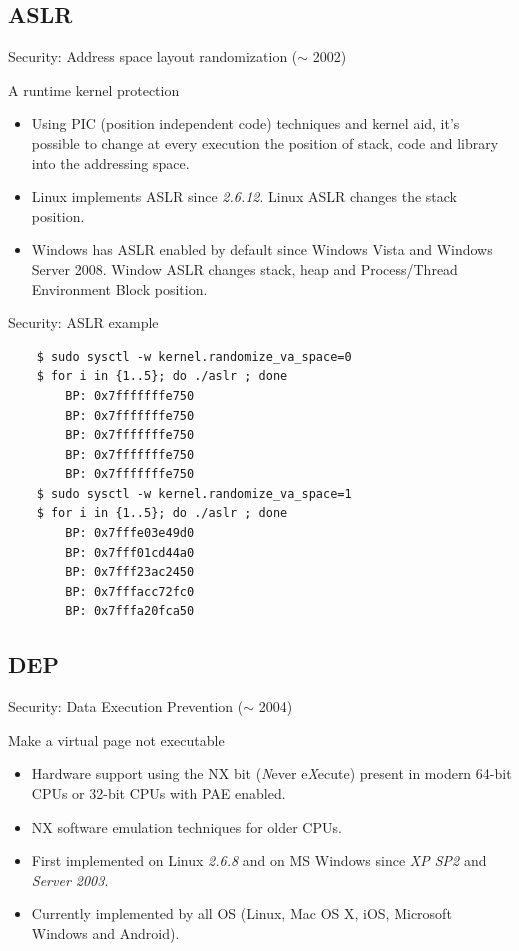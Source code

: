 \subsection{ASLR}
\begin{frame}[fragile]{Security: Address space layout randomization ($\sim$ 2002)}
	\begin{block}{A runtime kernel protection}
		\begin{itemize}
			\item Using PIC (position independent code) techniques and kernel aid,
				it's possible to change at every execution the position of stack, code
				and library into the addressing space.
			\item Linux implements ASLR since \emph{2.6.12}. Linux ASLR changes the
				stack position.
			\item Windows has ASLR enabled by default since Windows Vista and Windows
				Server 2008. Window ASLR changes stack, heap and Process/Thread
				Environment Block position.
		\end{itemize}
	\end{block}
\end{frame}

\begin{frame}[fragile]{Security: ASLR example}
	\begin{lstlisting}
	$ sudo sysctl -w kernel.randomize_va_space=0
	$ for i in {1..5}; do ./aslr ; done
		BP: 0x7fffffffe750
		BP: 0x7fffffffe750
		BP: 0x7fffffffe750
		BP: 0x7fffffffe750
		BP: 0x7fffffffe750
	$ sudo sysctl -w kernel.randomize_va_space=1
	$ for i in {1..5}; do ./aslr ; done
		BP: 0x7fffe03e49d0
		BP: 0x7fff01cd44a0
		BP: 0x7fff23ac2450
		BP: 0x7fffacc72fc0
		BP: 0x7fffa20fca50
	\end{lstlisting}
\end{frame}

\subsection{DEP}
\begin{frame}{Security: Data Execution Prevention ($\sim$ 2004)}
	\begin{block}{Make a virtual page not executable}
		\begin{itemize}
			\item Hardware support using the NX bit (\emph{N}ever e\emph{X}ecute)
				present in modern 64-bit CPUs or 32-bit CPUs with PAE enabled.
			\item NX software emulation techniques for older CPUs.
			\item First implemented on Linux \emph{2.6.8} and on MS Windows since
				\emph{XP SP2} and \emph{Server 2003}.
			\item Currently implemented by all OS (Linux, Mac OS X, iOS, Microsoft Windows and Android).
		\end{itemize}
	\end{block}
\end{frame}

